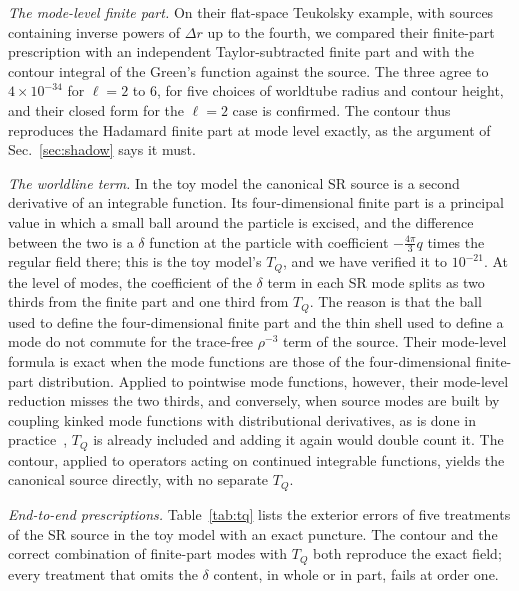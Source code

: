 \documentclass[aps,prd,twocolumn,superscriptaddress,nofootinbib,floatfix]{revtex4-2}
\begin{document}
\emph{The mode-level finite part.}
On their flat-space Teukolsky example, with sources containing inverse powers of $\Delta r$ up to the fourth, we compared their finite-part prescription with an independent Taylor-subtracted finite part and with the contour integral of the Green's function against the source.
The three agree to $4\times10^{-34}$ for $\ell=2$ to $6$, for five choices of worldtube radius and contour height, and their closed form for the $\ell=2$ case is confirmed.
The contour thus reproduces the Hadamard finite part at mode level exactly, as the argument of Sec.~\ref{sec:shadow} says it must.

\emph{The worldline term.}
In the toy model the canonical SR source is a second derivative of an integrable function.
Its four-dimensional finite part is a principal value in which a small ball around the particle is excised, and the difference between the two is a $\delta$ function at the particle with coefficient $-\tfrac{4\pi}{3}q$ times the regular field there; this is the toy model's $T_Q$, and we have verified it to $10^{-21}$.
At the level of modes, the coefficient of the $\delta$ term in each SR mode splits as two thirds from the finite part and one third from $T_Q$.
The reason is that the ball used to define the four-dimensional finite part and the thin shell used to define a mode do not commute for the trace-free $\rho^{-3}$ term of the source.
Their mode-level formula is exact when the mode functions are those of the four-dimensional finite-part distribution.
Applied to pointwise mode functions, however, their mode-level reduction misses the two thirds, and conversely, when source modes are built by coupling kinked mode functions with distributional derivatives, as is done in practice~\cite{Upton2026}, $T_Q$ is already included and adding it again would double count it.
The contour, applied to operators acting on continued integrable functions, yields the canonical source directly, with no separate $T_Q$.

\emph{End-to-end prescriptions.}
Table~\ref{tab:tq} lists the exterior errors of five treatments of the SR source in the toy model with an exact puncture.
The contour and the correct combination of finite-part modes with $T_Q$ both reproduce the exact field; every treatment that omits the $\delta$ content, in whole or in part, fails at order one.
\end{document}
